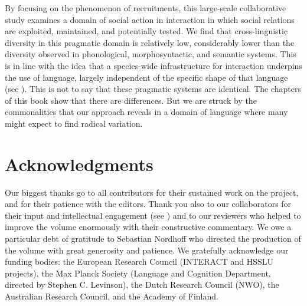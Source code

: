 \documentclass[output=paper,modfonts,nonflat]{langsci/langscibook}
\begin{document}
By focusing on the phenomenon of recruitments, this large-scale collaborative study examines a domain of social action in interaction in which social relations are exploited, maintained, and potentially tested. We find that cross-linguistic diversity in this pragmatic domain is relatively low, considerably lower than the diversity observed in phonological, morphosyntactic, and semantic systems. This is in line with the idea that a species-wide infrastructure for interaction underpins the use of language, largely independent of the specific shape of that language (see \citealt{Levinson2000,Levinson2006,Schegloff2006,Enfield2013,EnfieldSidnell2013,StiversEtAl2009,DingemanseEtAl2015}). This is not to say that these pragmatic systems are identical. The chapters of this book show that there are differences. But we are struck by the commonalities that our approach reveals in a domain of language where many might expect to find radical variation.

\section*{Acknowledgments}
Our biggest thanks go to all contributors for their sustained work on the project, and for their patience with the editors. Thank you also to our collaborators for their input and intellectual engagement (see ) and to our reviewers who helped to improve the volume enormously with their constructive commentary.
We owe a particular debt of gratitude to Sebastian Nordhoff who directed the production of the volume with great generosity and patience.
We gratefully acknowledge our funding bodies: the European Research Council (INTERACT and HSSLU projects), the Max Planck Society (Language and Cognition Department, directed by Stephen C. Levinson), the Dutch Research Council (NWO), the Australian Research Council, and the Academy of Finland.

{\sloppy\printbibliography[heading=subbibliography,notkeyword=this]}
\end{document}
